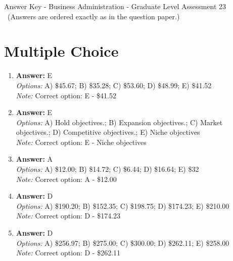 \documentclass[12pt]{article}
\begin{document}
\begin{center}
Answer Key - Business Administration - Graduate Level Assessment 23 \
\small (Answers are ordered exactly as in the question paper.)
\end{center}

\section*{Multiple Choice}
\begin{enumerate}[label=\arabic*.]
\item \textbf{Answer:} E
\\ \textit{Options:} A) \$45.67; B) \$35.28; C) \$53.60; D) \$48.99; E) \$41.52
\\ \textit{Note:} Correct option: E - \$41.52
\item \textbf{Answer:} E
\\ \textit{Options:} A) Hold objectives.; B) Expansion objectives.; C) Market objectives.; D) Competitive objectives.; E) Niche objectives
\\ \textit{Note:} Correct option: E - Niche objectives
\item \textbf{Answer:} A
\\ \textit{Options:} A) \$12.00; B) \$14.72; C) \$6.44; D) \$16.64; E) \$32
\\ \textit{Note:} Correct option: A - \$12.00
\item \textbf{Answer:} D
\\ \textit{Options:} A) \$190.20; B) \$152.35; C) \$198.75; D) \$174.23; E) \$210.00
\\ \textit{Note:} Correct option: D - \$174.23
\item \textbf{Answer:} D
\\ \textit{Options:} A) \$256.97; B) \$275.00; C) \$300.00; D) \$262.11; E) \$258.00
\\ \textit{Note:} Correct option: D - \$262.11
\end{enumerate}
\end{document}
